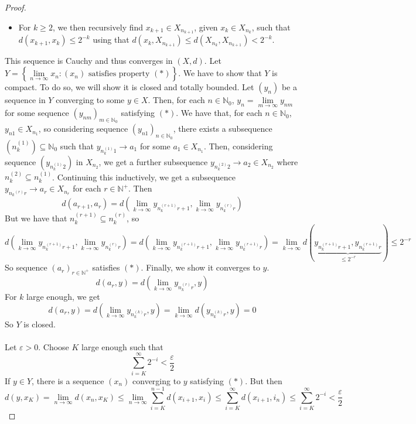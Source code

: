 \documentclass{article}
\theoremstyle{plain}
\theoremstyle{definition}
\theoremstyle{remark}
\begin{document}
\begin{proof}
\begin{itemize}
    \item For $k\ge 2$, we then recursively find $x_{k+1}\in X_{n_{k+1}}$, given $x_{k}\in X_{n_{k}}$, such that $d(x_{k+1}, x_{k}) \le 
    2^{-k}$ using that $d(x_k, X_{n_{k+1}}) \le d(X_{n_k}, X_{n_{k+1}}) < 2^{-k}$.
\end{itemize}
This sequence is Cauchy and thus converges in $(X,d)$. Let $Y = \left \{\lim \limits _{n \to \infty}x_n:(x_n) \text{ satisfies property } (*) \right \}$. We have to show that $Y$ is compact. To do so, we will show it is closed and totally bounded. Let $(y_n)$ be a sequence in $Y$ converging to some $y \in X$. Then, for each $n \in \mathbb{N}_0$, $y_n = \lim \limits _{m \to \infty } y_{nm}$ for some sequence $(y_{nm})_{m \in \mathbb{N}_0}$ satisfying $(*)$. We have that, for each $n \in \mathbb{N}_0$, $y_{n1} \in X_{n_1}$, so considering sequence $(y_{n1})_{n \in \mathbb{N}_0}$, there exists a subsequence $(n_k ^{(1)}) \subseteq \mathbb{N}_0$ such that $y_{{n_k^{(1)}}1} \to a_1$ for some $a_1 \in X_{n_1}$. Then, considering sequence $(y_{{n_k^{(1)}}2})$ in $X_{n_2}$, we get a further subsequence $y_{n_k^{(2)}2 } \to a_2 \in X_{n_2}$ where $n_k^{(2)} \subseteq n_k ^{(1)}$. Continuing this inductively, we get a subsequence $y_{{n_k}^{(r)}r} \to a_r \in X_{n_r} $ for each $r \in \mathbb{N}^+$. Then \[
d(a_{r+1}, a_r) = d \left (\lim \limits _{k \to \infty} y_{n_k ^{(r+1)}r+1}, \lim \limits _{k \to \infty} y_{n_k ^{(r)}r} \right ) 
\] 
But we have that $n_k ^{(r+1)} \subseteq n_k ^{(r)}$, so \[
 d \left (\lim \limits _{k \to \infty} y_{n_k ^{(r+1)}r+1}, \lim \limits _{k \to \infty} y_{n_k ^{(r)}r} \right ) = d \left (\lim \limits _{k \to \infty} y_{n_k ^{(r+1)}r+1}, \lim \limits _{k \to \infty} y_{n_k ^{(r+1)}r} \right ) = \lim \limits _{k \to \infty } d \left (\underbrace{y_{n_k ^{(r+1)}r+1}, y_{n_k ^{(r+1)}r}}_{\le 2^{-r}} \right ) \le 2^{-r}
\]
So sequence $(a_r)_{r \in \mathbb{N}^+}$ satisfies $(*)$. Finally, we show it converges to $y$. \[
d(a_r, y) = d \left (  \lim \limits _{k \to \infty } y_{n_k^{(r)}r}, y\right )
\]
For $k$ large enough, we get \[
d(a_r, y) = d \left (  \lim \limits _{k \to \infty } y_{n_k^{(k)}r}, y\right ) = \lim \limits _{k \to \infty }d \left ( y_{n_k^{(k)}r}, y\right ) = 0
\]
So $Y$ is closed. ~\\~\\
Let $\varepsilon > 0$. Choose $K$ large enough such that \[
\sum \limits _{i=K}^\infty 2^{-i} < \frac{\varepsilon}{2}
\]
If $y \in Y$, there is a sequence $(x_n)$ converging to $y$ satisfying $(*)$. But then \[
d(y,x _K) = \lim \limits _{n \to \infty} d(x_n, x_K) \le \lim \limits _{n \to \infty} \sum \limits _{i=K}^{n-1} d(x_{i+1}, x_i) \le \sum \limits _{i=K}^{\infty }d(x_{i+1}, i_n) \le \sum \limits _{i = K} ^\infty 2^{-i} < \frac{\varepsilon}{2}
\]
\end{proof}
\end{document}
